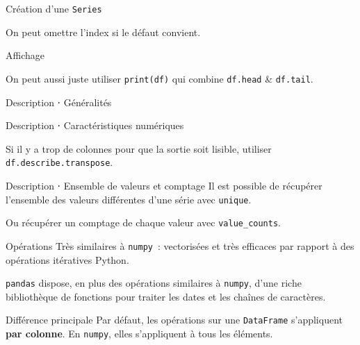 \begin{frame}{Création d'une \texttt{Series}}

  On peut omettre l'index si le défaut convient.
\end{frame}

\begin{frame}{Affichage}

  On peut aussi juste utiliser \texttt{print(df)} qui combine \texttt{df.head} \& \texttt{df.tail}.
\end{frame}

\begin{frame}{Description ⋅ Généralités}
\end{frame}

\begin{frame}{Description ⋅ Caractéristiques numériques}

  Si il y a trop de colonnes pour que la sortie soit lisible, utiliser \texttt{df.describe.transpose}.
\end{frame}

\begin{frame}{Description ⋅ Ensemble de valeurs et comptage}
  Il est possible de récupérer l'ensemble des valeurs différentes d'une série avec \texttt{unique}.
  
  Ou récupérer un comptage de chaque valeur avec \texttt{value\_counts}.
\end{frame}

\begin{frame}{Opérations}
  Très similaires à \texttt{numpy}~: vectorisées et très efficaces par rapport à des opérations itératives Python.

  \texttt{pandas} dispose, en plus des opérations similaires à \texttt{numpy}, d'une riche bibliothèque de fonctions pour traiter les dates et les chaînes de caractères.

  \begin{alertblock}{Différence principale}
    Par défaut, les opérations sur une \texttt{DataFrame} s'appliquent \textbf{par colonne}. En \texttt{numpy}, elles s'appliquent à tous les éléments.
  \end{alertblock}
\end{frame}

